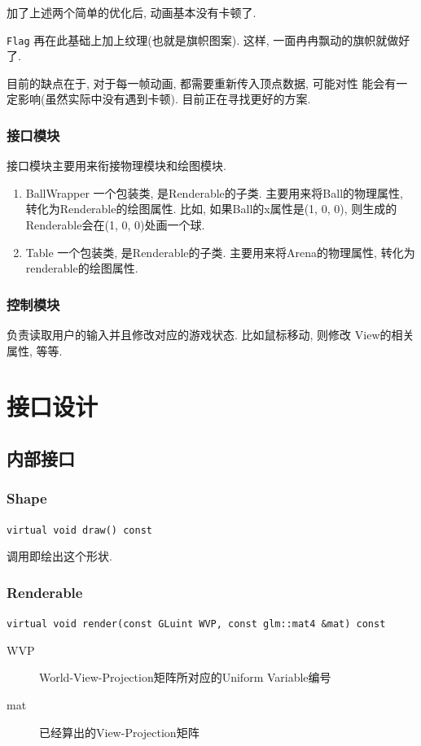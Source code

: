 \documentclass[11pt]{article}
\begin{document}
\begin{enumerate}
加了上述两个简单的优化后, 动画基本没有卡顿了.

\texttt{Flag} 再在此基础上加上纹理(也就是旗帜图案). 这样, 一面冉冉飘动的旗帜就做好了.

目前的缺点在于, 对于每一帧动画, 都需要重新传入顶点数据, 可能对性
能会有一定影响(虽然实际中没有遇到卡顿). 目前正在寻找更好的方案.
\end{enumerate}
\subsubsection{接口模块}
\label{sec-3-2-3}
接口模块主要用来衔接物理模块和绘图模块.
\begin{enumerate}
\item BallWrapper
\label{sec-3-2-3-1}
一个包装类, 是Renderable的子类. 主要用来将Ball的物理属性, 转化为Renderable的绘图属性.
比如, 如果Ball的x属性是(1, 0, 0), 则生成的Renderable会在(1, 0,
0)处画一个球.
\item Table
\label{sec-3-2-3-2}
一个包装类, 是Renderable的子类. 主要用来将Arena的物理属性, 转化为
renderable的绘图属性.
\end{enumerate}
\subsubsection{控制模块}
\label{sec-3-2-4}
负责读取用户的输入并且修改对应的游戏状态. 比如鼠标移动, 则修改
View的相关属性, 等等.
\section{接口设计}
\label{sec-4}
\subsection{内部接口}
\label{sec-4-1}
\subsubsection{Shape}
\label{sec-4-1-1}

\texttt{virtual void draw() const}

调用即绘出这个形状.


\subsubsection{Renderable}
\label{sec-4-1-2}

\texttt{virtual void render(const GLuint WVP, const glm::mat4 \&mat) const}
\begin{description}
\item[{WVP}] World-View-Projection矩阵所对应的Uniform Variable编号
\item[{mat}] 已经算出的View-Projection矩阵
\end{description}
\end{document}
